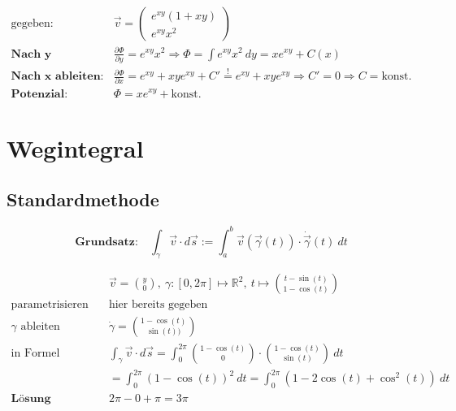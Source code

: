 \documentclass[11pt]{article}
\begin{document}
\begin{equation*}
\begin{split}
	\text{gegeben:} \quad & \vec{v} = \begin{pmatrix}
		e^{xy}(1+xy) \\ e^{xy}x^2
	\end{pmatrix} \\
	\textbf{Nach y integrieren:} \quad & \frac{\partial\Phi}{\partial y} = e^{xy}x^2 \Rightarrow \Phi = \int e^{xy}x^2\ dy = xe^{xy} + C(x) \\
	\textbf{Nach x ableiten:} \quad & \frac{\partial\Phi}{\partial x} = e^{xy} + xye^{xy} + C' \stackrel{!}{=} e^{xy} + xye^{xy} \Rightarrow C' = 0 \Rightarrow C = \text{konst.} \\
	\textbf{Potenzial:} \quad & \Phi = xe^{xy} + \text{konst.}
\end{split}
\end{equation*}

\section{Wegintegral}

\subsection{Standardmethode}

\begin{equation*}
	\textbf{Grundsatz:}\quad \int_\gamma \vec{v}\cdot d\vec{s} := \int_a^b \vec{v}(\vec{\gamma}(t)) \cdot \dot\vec{\gamma}(t)\ dt
\end{equation*}

\begin{equation*}
\begin{split}
	& \vec{v} = \binom{y}{0},\ \gamma:[0, 2\pi] \mapsto \mathbb{R}^2,\ t \mapsto \binom{t -\sin(t)}{1-\cos(t)} \\
	\text{parametrisieren}\quad & \text{hier bereits gegeben} \\
	\text{$\gamma$ ableiten}\quad & \dot\gamma = \binom{1-\cos(t)}{\sin(t))} \\
	\text{in Formel einsetzen}\quad & \int_\gamma \vec{v} \cdot d\vec{s} = \int_0^{2\pi} \binom{1-\cos(t)}{0}\cdot\binom{1-\cos(t)}{\sin(t)}\ dt \\
	&= \int_0^{2\pi} (1-\cos(t))^2\ dt = \int_0^{2\pi} (1-2\cos(t)+\cos^2(t))\ dt \\
	\textbf{L{\"o}sung}\quad & 2\pi - 0 + \pi = 3\pi
\end{split}
\end{equation*}
\end{document}
